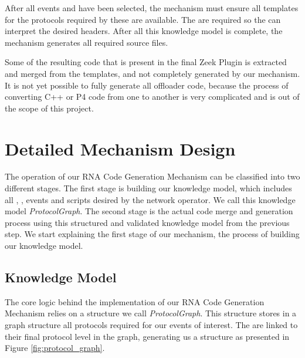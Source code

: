 After all events and \Offloaders{} have been selected, the mechanism must ensure all templates for the protocols required by these \Offloaders{} are available. The \ProtocolTemplates{} are required so the \Offloaders{} can interpret the desired headers. After all this knowledge model is complete, the mechanism generates all required source files.

Some of the resulting code that is present in the final Zeek Plugin is extracted and merged from the templates, and not completely generated by our mechanism. It is not yet possible to fully generate all offloader code, because the process of converting C++ or P4 code from one to another is very complicated and is out of the scope of this project.

% 
% 

\section{Detailed Mechanism Design}
\label{sec:code_gen_impl}

The operation of our RNA Code Generation Mechanism can be classified into two different stages. The first stage is building our knowledge model, which includes all \ProtocolTemplates{}, \Offloaders{}, events and scripts desired by the network operator. We call this knowledge model \textit{ProtocolGraph}. The second stage is the actual code merge and generation process using this structured and validated knowledge model from the previous step. We start explaining the first stage of our mechanism, the process of building our knowledge model.

\subsection{Knowledge Model}

The core logic behind the implementation of our RNA Code Generation Mechanism relies on a structure we call \textit{ProtocolGraph}. This structure stores in a graph structure all protocols required for our events of interest. The \Offloaders{} are linked to their final protocol level in the graph, generating us a structure as presented in Figure \ref{fig:protocol_graph}.

